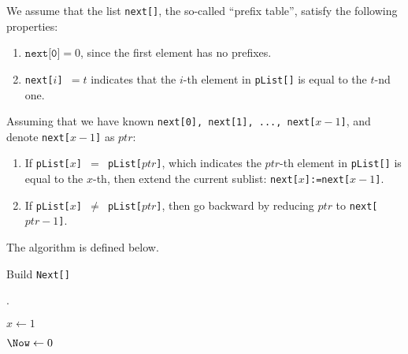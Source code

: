 


\def\HWTITLE{Homework 5}
\def\COURSECODE{CS 225: Data Structures}
\def\AUTHOR{Group D1}



\makeMyTitle
\thispagestyle{firstPage}

\begin{questions}

    We assume that the list \texttt{next[]}, the so-called ``prefix table'', satisfy the following properties:
    \begin{enumerate}
        \item $\texttt{next[0]} = 0$, since the first element has no prefixes.
        \item \texttt{next[$i$] $= t$} indicates that the $i$-th element in \texttt{pList[]} is equal to the $t$-nd one.
    \end{enumerate}

    Assuming that we have known \texttt{next[0], next[1], ..., next[$x-1$]}, and denote \texttt{next[$x-1$]} as $ptr$:

    \begin{enumerate}
        \item If \texttt{pList[$x$] $=$ pList[$ptr$]}, which indicates the $ptr$-th element in \texttt{pList[]} is equal to the $x$-th, then extend the current sublist: \texttt{next[$x$]:=next[$x-1$]}.

        \item If \texttt{pList[$x$] $\neq$ pList[$ptr$]}, then go backward by reducing $ptr$ to \texttt{next[$ptr-1$]}.
    \end{enumerate}

    The algorithm is defined below.

    \begin{algorithm}
        \caption{Build \texttt{Next[]}}
        \label{alg-build-next}

        \Next.

        $x \gets 1$

        $\Now \gets 0$

\end{algorithm}
\end{questions}
